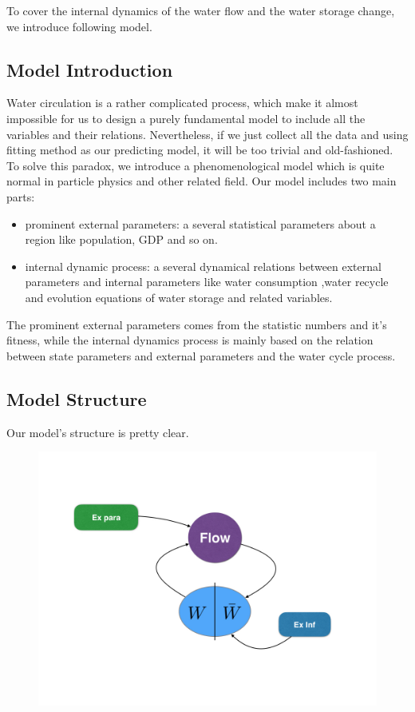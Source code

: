 To cover the internal dynamics of the water flow and the water storage change, we introduce following model.

  \subsection{Model Introduction}
    Water circulation is a rather complicated process, which make it almost impossible for us to design a purely fundamental model to include all the variables and their relations. Nevertheless, if we just collect all the data and using fitting method as our predicting model, it will be too trivial and old-fashioned. To solve this paradox, we introduce a phenomenological model which is quite normal in particle physics and other related field. Our model includes two main parts:
    \begin{itemize}
      \item prominent external parameters: a several statistical parameters about a region like population, GDP and so on.
      \item internal dynamic process: a several dynamical relations between external parameters and internal parameters like water consumption ,water recycle and evolution equations of water storage and related variables.
    \end{itemize}
    The prominent external parameters comes from the statistic numbers and it's fitness, while the internal dynamics process is mainly based on the relation between state parameters and external parameters and the water cycle process.

  \subsection{Model Structure}

    Our model's structure is pretty clear.
    \begin{figure}[!h]
    \begin{center}
    \includegraphics[width = 12cm]{picture/struc.jpg}
    \end{center}
    \end{figure}

